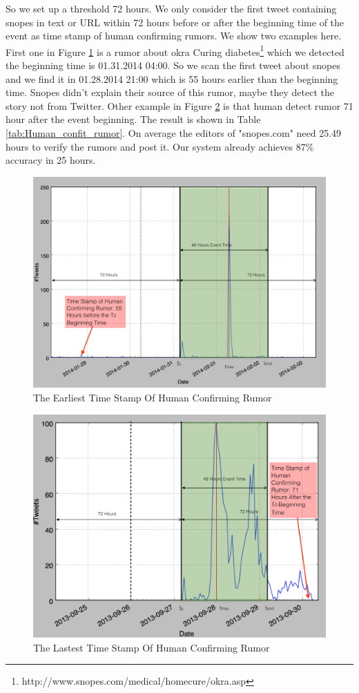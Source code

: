 So we set up a threshold 72 hours. We only consider the first tweet containing snopes in text or URL within 72 hours before or after the beginning time of the event as time stamp of human confirming rumors. We show two examples here. First one in Figure \ref{fig:ealiset_rumo} is a rumor about okra Curing diabetes\footnote{http://www.snopes.com/medical/homecure/okra.asp} which we detected the beginning time is 01.31.2014 04:00. So we scan the first tweet about snopes and we find it in 01.28.2014 21:00 which is 55 hours earlier than the beginning time. Snopes didn't explain their source of this rumor, maybe they detect the story not from Twitter. 
Other example in Figure \ref{fig:lastest_rumo} is that  human detect rumor 71 hour after the event beginning.  
The result is shown in Table \ref{tab:Human_confit_rumor}. On average the editors of "snopes.com" need 25.49 hours to verify the rumors and post it. Our system already achieves 87\% accuracy in 25 hours. 
     \begin{figure}[!h]
\centering
\includegraphics[width=0.8\columnwidth]{images/Timestamphummanearlist.png}
\caption{The Earliest Time Stamp Of Human Confirming Rumor}
\label{fig:ealiset_rumo}
\end{figure} 
  \begin{figure}[!h]
\centering
\includegraphics[width=0.8\columnwidth]{images/Timestamphummanlatest.png}
\caption{The Lastest Time Stamp Of Human Confirming Rumor}
\label{fig:lastest_rumo}
\end{figure} 
